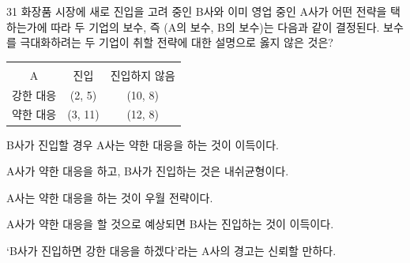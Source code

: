 \begin{question}{31}
화장품 시장에 새로 진입을 고려 중인 B사와 이미 영업 중인 A사가 어떤 전략을 택하는가에 따라 두 기업의 보수, 즉 (A의 보수, B의 보수)는 다음과 같이 결정된다. 보수를 극대화하려는 두 기업이 취할 전략에 대한 설명으로 옳지 않은 것은?

{\small\centering
\begin{tabular}{|c|c|c|}
\hline
\makecell[l]{\hspace*{2em}B\\A} & 진입 & 진입하지 않음 \\
\hline
강한 대응 & (2, 5) & (10, 8) \\
\hline
약한 대응 & (3, 11) & (12, 8) \\
\hline
\end{tabular}\par}

\begin{choices}
  \item B사가 진입할 경우 A사는 약한 대응을 하는 것이 이득이다.
  \item A사가 약한 대응을 하고, B사가 진입하는 것은 내쉬균형이다.
  \item A사는 약한 대응을 하는 것이 우월 전략이다.
  \item A사가 약한 대응을 할 것으로 예상되면 B사는 진입하는 것이 이득이다.
  \item ‘B사가 진입하면 강한 대응을 하겠다’라는 A사의 경고는 신뢰할 만하다.
\end{choices}
\end{question}

